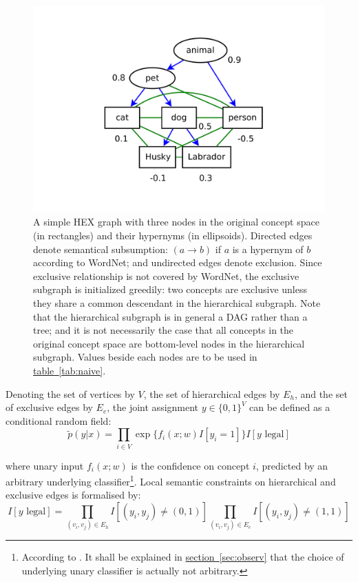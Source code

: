\documentclass[11pt,a4paper]{article}
\begin{document}
\begin{figure}[htbp]
\centering
\includegraphics[scale=0.5]{naive.pdf}
\caption{A simple HEX graph with three nodes in the original concept space (in rectangles) and their hypernyms (in ellipsoids). Directed edges denote semantical subsumption: $(a\rightarrow b)$ if $a$ is a hypernym of $b$ according to WordNet; and undirected edges denote exclusion. Since exclusive relationship is not covered by WordNet, the exclusive subgraph is initialized greedily: two concepts are exclusive unless they share a common descendant in the hierarchical subgraph. Note that the hierarchical subgraph is in general a DAG rather than a tree; and it is not necessarily the case that all concepts in the original concept space are bottom-level nodes in the hierarchical subgraph. Values beside each nodes are to be used in \hyperref[tab:naive]{table~\ref{tab:naive}}.}
\label{fig:naive}
\end{figure}

Denoting the set of vertices by $V$, the set of hierarchical edges by $E_h$, and the set of exclusive edges by $E_e$, the joint assignment $y\in\{0,1\}^V$ can be defined as a conditional random field:
\begin{equation}
\tilde{p}(y|x)=\prod_{i\in V}\exp\{f_i(x;w)I[y_i=1]\}I[y\text{ legal}]
\label{eqn:naive}
\end{equation}

where unary input $f_i(x;w)$ is the confidence on concept $i$, predicted by an arbitrary underlying classifier\footnote{According to \cite{deng2014large}. It shall be explained in \hyperref[sec:observ]{section~\ref{sec:observ}} that the choice of underlying unary classifier is actually not arbitrary.}. Local semantic constraints on hierarchical and exclusive edges is formalised by:
\begin{equation}
I[y\text{ legal}]=\prod_{(v_i,v_j)\in E_h}I[(y_i,y_j)\neq(0,1)]\prod_{(v_i,v_j)\in E_e}I[(y_i,y_j)\neq(1,1)]
\label{eqn:legal}
\end{equation}
\end{document}
